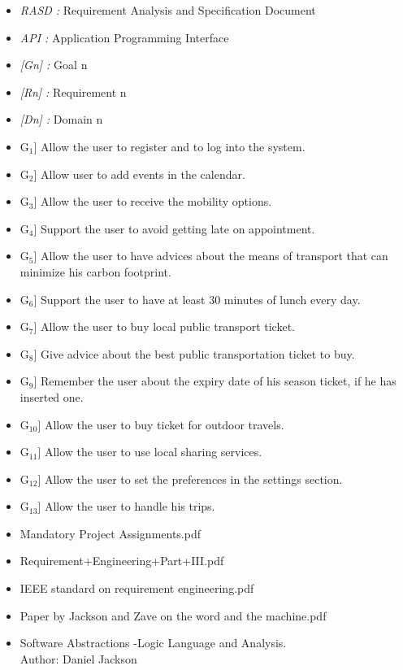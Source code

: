 \begin{itemize}
	\setlength{\leftskip}{0.5cm}
	\item \emph{RASD : }Requirement Analysis and Specification Document
	\item \emph{API : }Application Programming Interface
\end{itemize}
\begin{itemize}
	\setlength{\leftskip}{0.5cm}
	\item \emph{[Gn] : }Goal n
	\item \emph{[Rn] : }Requirement n
	\item \emph{[Dn] : }Domain n
\end{itemize}
\begin{itemize}
	\setlength{\leftskip}{0.5cm}
	\item \lbrack G$_{1}$] Allow the user to register and to log into the system.
	\item \lbrack G$_{2}$] Allow user to add events in the calendar.
	\item \lbrack G$_{3}$] Allow the user to receive the mobility options.
	\item \lbrack G$_{4}$] Support the user to avoid getting late on appointment.
	\item \lbrack G$_{5}$] Allow the user to have advices about the means of transport that can minimize his carbon footprint.
	\item \lbrack G$_{6}$] Support the user to have at least 30 minutes of lunch every day.
	\item \lbrack G$_{7}$] Allow the user to buy local public transport ticket.
	\item \lbrack G$_{8}$] Give advice about the best public transportation ticket to buy.
	\item \lbrack G$_{9}$] Remember the user about the expiry date of his season ticket, if he has inserted one.
	\item \lbrack G$_{10}$] Allow the user to buy ticket for outdoor travels.
	\item \lbrack G$_{11}$] Allow the user to use local sharing services.
	\item \lbrack G$_{12}$] Allow the user to set the preferences in the settings section.
	\item \lbrack G$_{13}$] Allow the user to handle his trips.
\end{itemize}
\begin{itemize}
	\setlength{\leftskip}{0.5cm}
	\item Mandatory Project Assignments.pdf
	\item Requirement+Engineering+Part+III.pdf
	\item IEEE standard on requirement engineering.pdf
	\item Paper by Jackson and Zave on the word and the machine.pdf
	\item Software Abstractions -Logic Language and Analysis.\\
	Author: Daniel Jackson
\end{itemize}
